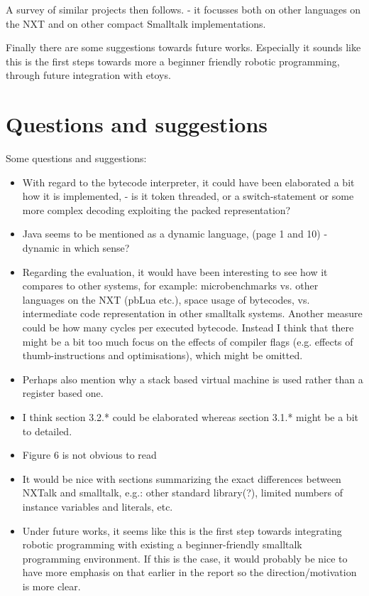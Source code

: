 \documentclass{article}
\begin{document}
A survey of similar projects then follows. - it focusses both on other languages on the NXT and on other compact Smalltalk implementations. 

Finally there are some suggestions towards future works. 
Especially it sounds like this is the first steps towards more a beginner friendly robotic programming, through future integration with etoys.

\section*{Questions and suggestions}
Some questions and suggestions:

\begin{itemize}
\item
With regard to the bytecode interpreter, it
could have been elaborated a bit how it is implemented,
- is it token threaded, or a switch-statement or some
more complex decoding exploiting the packed representation?
\item
Java seems to be mentioned as a dynamic language, (page 1 and 10)
- dynamic in which sense?
\item
Regarding the evaluation, it would have been interesting
to see how it compares to other systems, for example:
microbenchmarks vs. other languages on the NXT (pbLua etc.),
space usage of bytecodes, vs. intermediate code representation
in other smalltalk systems.
Another measure could be how many cycles per executed bytecode.
Instead I think that there might be a bit too much focus on the effects of compiler flags (e.g. effects of thumb-instructions and optimisations), which might be omitted.
\item
Perhaps also mention why a stack based virtual machine is used rather than a register based one.
\item
I think section 3.2.* could be elaborated whereas section 3.1.* might be a bit to detailed.
\item
Figure 6 is not obvious to read
\item
It would be nice with sections summarizing the exact differences between NXTalk and smalltalk, e.g.: other standard library(?), limited numbers of instance variables and literals, etc.
\item
Under future works, it seems like this is the first step towards integrating robotic programming with existing a beginner-friendly smalltalk programming environment. If this is the case, it would probably be nice to have more emphasis on that earlier in the report so the direction/motivation is more clear.
\end{itemize}
\end{document}
